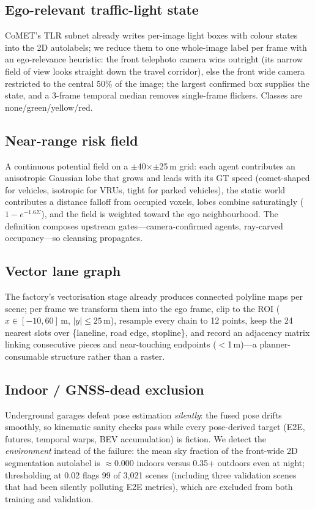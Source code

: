 \documentclass[10pt,twocolumn]{article}
\begin{document}
\subsection{Ego-relevant traffic-light state}
CoMET's TLR subnet already writes per-image light boxes with colour states
into the 2D autolabels; we reduce them to one whole-image label per frame
with an ego-relevance heuristic: the front telephoto camera wins outright
(its narrow field of view looks straight down the travel corridor), else the
front wide camera restricted to the central 50\% of the image; the largest
confirmed box supplies the state, and a 3-frame temporal median removes
single-frame flickers. Classes are none/green/yellow/red.

\subsection{Near-range risk field}
A continuous potential field on a $\pm$40$\times$$\pm$25\,m grid: each
agent contributes an anisotropic Gaussian lobe that grows and leads with its
GT speed (comet-shaped for vehicles, isotropic for VRUs, tight for parked
vehicles), the static world contributes a distance falloff from occupied
voxels, lobes combine saturatingly ($1-e^{-1.6\Sigma}$), and the field is
weighted toward the ego neighbourhood. The definition composes upstream
gates---camera-confirmed agents, ray-carved occupancy---so cleansing
propagates.

\subsection{Vector lane graph}
The factory's vectorisation stage already produces connected polyline maps
per scene; per frame we transform them into the ego frame, clip to the ROI
($x\in[-10,60]$\,m, $|y|\le25$\,m), resample every chain to 12 points, keep
the 24 nearest slots over \{laneline, road edge, stopline\}, and record an
adjacency matrix linking consecutive pieces and near-touching endpoints
($<$1\,m)---a planner-consumable structure rather than a raster.

\subsection{Indoor / GNSS-dead exclusion}
Underground garages defeat pose estimation \emph{silently}: the fused pose
drifts smoothly, so kinematic sanity checks pass while every pose-derived
target (E2E, futures, temporal warps, BEV accumulation) is fiction. We
detect the \emph{environment} instead of the failure: the mean sky fraction
of the front-wide 2D segmentation autolabel is $\approx$0.000 indoors versus
0.35+ outdoors even at night; thresholding at 0.02 flags 99 of 3{,}021
scenes (including three validation scenes that had been silently polluting
E2E metrics), which are excluded from both training and validation.
\end{document}
